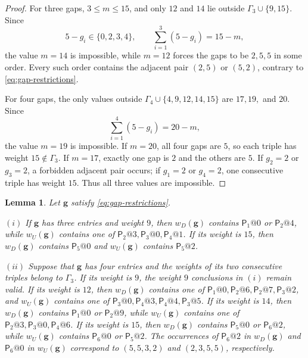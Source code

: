 \documentclass[11pt]{amsart}
\newtheorem{lemma}[theorem]{Lemma}
\theoremstyle{definition}
\begin{document}
\begin{proof}
For three gaps, $3\leq m\leq15$, and only $12$ and $14$ lie outside
$\Gamma_3\cup\{9,15\}$. Since
\[
5-g_i\in\{0,2,3,4\},\qquad
\sum_{i=1}^3(5-g_i)=15-m,
\]
the value $m=14$ is impossible, while $m=12$ forces the gaps to be
$2,5,5$ in some order. Every such order contains the adjacent pair
$(2,5)$ or $(5,2)$, contrary to \eqref{eq:gap-restrictions}.

For four gaps, the only values outside
$\Gamma_4\cup\{4,9,12,14,15\}$ are $17,19,$ and $20$. Since
\[
\sum_{i=1}^4(5-g_i)=20-m,
\]
the value $m=19$ is impossible. If $m=20$, all four gaps are $5$, so
each triple has weight $15\notin\Gamma_3$. If $m=17$, exactly one gap
is $2$ and the others are $5$. If $g_2=2$ or $g_3=2$, a forbidden
adjacent pair occurs; if $g_1=2$ or $g_4=2$, one consecutive triple
has weight $15$. Thus all three values are impossible.
\end{proof}

\begin{lemma}\label{lem:word-obstructions}
Let $\mathbf g$ satisfy \eqref{eq:gap-restrictions}.

\noindent
$(i)$ If $\mathbf g$ has three entries and weight $9$, then
$w_D(\mathbf g)$ contains $\mathsf P_1@0$ or $\mathsf P_2@4$, while
$w_U(\mathbf g)$ contains one of
$\mathsf P_2@3,\mathsf P_3@0,\mathsf P_4@1$.
If its weight is $15$, then $w_D(\mathbf g)$ contains
$\mathsf P_5@0$ and $w_U(\mathbf g)$ contains $\mathsf P_5@2$.

\noindent
$(ii)$ Suppose that $\mathbf g$ has four entries and the weights of its
two consecutive triples belong to $\Gamma_3$. If its weight is $9$, the
weight $9$ conclusions in $(i)$ remain valid. If its weight is $12$,
then $w_D(\mathbf g)$ contains one of $\mathsf P_1@0,\mathsf P_2@6,\mathsf P_2@7,\mathsf P_3@2$,
and $w_U(\mathbf g)$ contains one of $\mathsf P_3@0,\mathsf P_4@3,\mathsf P_4@4,\mathsf P_3@5$.
If its weight is $14$, then $w_D(\mathbf g)$ contains
$\mathsf P_1@0$ or $\mathsf P_2@9$, while $w_U(\mathbf g)$ contains
one of $\mathsf P_2@3,\mathsf P_3@0,\mathsf P_4@6$.
If its weight is $15$, then $w_D(\mathbf g)$ contains
$\mathsf P_5@0$ or $\mathsf P_6@2$, while $w_U(\mathbf g)$ contains
$\mathsf P_6@0$ or $\mathsf P_5@2$.
The occurrences of $\mathsf P_6@2$ in $w_D(\mathbf g)$ and
$\mathsf P_6@0$ in $w_U(\mathbf g)$ correspond to
$(5,5,3,2)$ and $(2,3,5,5)$, respectively.
\end{lemma}
\end{document}
